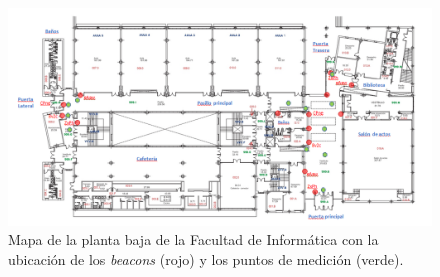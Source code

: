 \begin{figure}[!h]
	\centering
	\includegraphics[width=1\textwidth]{Imagenes/Descripciondeltrabajo/mapa_mediciones_plantabaja}
	\caption{Mapa de la planta baja de la Facultad de Informática con la ubicación de los \textit{beacons} (rojo) y los puntos de medición (verde). }
	\label{fig:medidasPBaja}
\end{figure}


